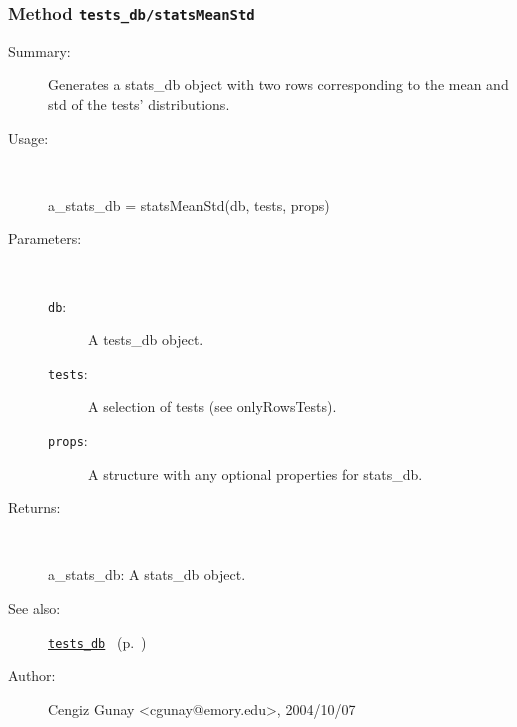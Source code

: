 \subsubsection[Method \texttt{statsMeanStd}]{Method \texttt{tests\_db/statsMeanStd}}%
%
\label{ref_tests_db__statsMeanStd}%
\hypertarget{ref_tests_db__statsMeanStd}{}%
\begin{description}
\item[Summary:]Generates a stats\_db object with two rows corresponding to 
		the mean and std of the tests' distributions.
%
\item[Usage:]~%
\begin{lyxcode}%
a\_stats\_db = statsMeanStd(db, tests, props)
%
\end{lyxcode}%
%
%
\item[Parameters:]~
\begin{description}%
\item[\texttt{db}:]
 A tests\_db object.
\item[\texttt{tests}:]
 A selection of tests (see onlyRowsTests).
\item[\texttt{props}:]
 A structure with any optional properties for stats\_db.
\end{description}%
%
\item[Returns:]~

	a\_stats\_db: A stats\_db object.
%
%
\item[See also:]%
\hyperlink{ref_tests_db}{\texttt{tests\_db}}%
\ (p.~\pageref{ref_tests_db})%
%
%
\item[Author:]%
Cengiz Gunay <cgunay@emory.edu>, 2004/10/07%
\end{description}
\methodline%
